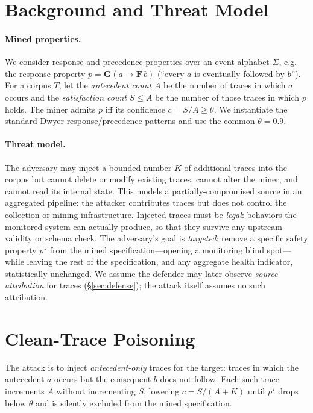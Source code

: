 \documentclass[runningheads]{llncs}
\begin{document}
\section{Background and Threat Model}\label{sec:bg}
\paragraph{Mined properties.}
We consider response and precedence properties over an event alphabet $\Sigma$,
e.g. the response property $p=\mathbf{G}(a\rightarrow\mathbf{F}\,b)$ (``every $a$
is eventually followed by $b$''). For a corpus $T$, let the \emph{antecedent
count} $A$ be the number of traces in which $a$ occurs and the \emph{satisfaction
count} $S\le A$ be the number of those traces in which $p$ holds. The miner
admits $p$ iff its confidence $c=S/A\ge\theta$. We instantiate the standard Dwyer
response/precedence patterns and use the common $\theta=0.9$.

\paragraph{Threat model.}
The adversary may inject a bounded number $K$ of additional traces into the
corpus but cannot delete or modify existing traces, cannot alter the miner, and
cannot read its internal state. This models a partially-compromised source in an
aggregated pipeline: the attacker contributes traces but does not control the
collection or mining infrastructure. Injected traces must be \emph{legal}:
behaviors the monitored system can actually produce, so that they survive any
upstream validity or schema check. The adversary's goal is \emph{targeted}:
remove a specific safety property $p^\star$ from the mined specification---opening
a monitoring blind spot---while leaving the rest of the specification, and any
aggregate health indicator, statistically unchanged. We assume the defender may
later observe \emph{source attribution} for traces (\S\ref{sec:defense}); the
attack itself assumes no such attribution.

\section{Clean-Trace Poisoning}\label{sec:attack}
The attack is to inject \emph{antecedent-only} traces for the target: traces in
which the antecedent $a$ occurs but the consequent $b$ does not follow. Each such
trace increments $A$ without incrementing $S$, lowering $c=S/(A+K)$ until $p^\star$
drops below $\theta$ and is silently excluded from the mined specification.
\end{document}

